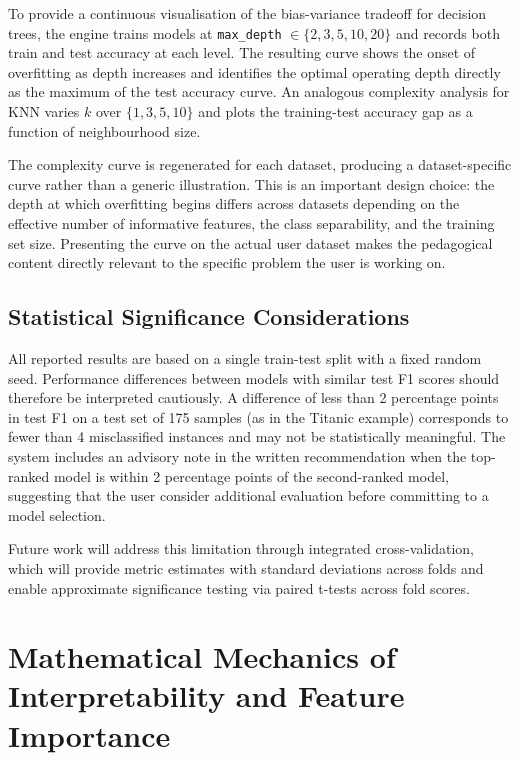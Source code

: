 \documentclass[conference]{IEEEtran}
\begin{document}
To provide a continuous visualisation of the bias-variance tradeoff for decision trees, the engine trains models at \texttt{max\_depth} $\in \{2, 3, 5, 10, 20\}$ and records both train and test accuracy at each level. The resulting curve shows the onset of overfitting as depth increases and identifies the optimal operating depth directly as the maximum of the test accuracy curve. An analogous complexity analysis for KNN varies $k$ over $\{1, 3, 5, 10\}$ and plots the training-test accuracy gap as a function of neighbourhood size.

The complexity curve is regenerated for each dataset, producing a dataset-specific curve rather than a generic illustration. This is an important design choice: the depth at which overfitting begins differs across datasets depending on the effective number of informative features, the class separability, and the training set size. Presenting the curve on the actual user dataset makes the pedagogical content directly relevant to the specific problem the user is working on.

\subsection{Statistical Significance Considerations}

All reported results are based on a single train-test split with a fixed random seed. Performance differences between models with similar test F1 scores should therefore be interpreted cautiously. A difference of less than 2 percentage points in test F1 on a test set of 175 samples (as in the Titanic example) corresponds to fewer than 4 misclassified instances and may not be statistically meaningful. The system includes an advisory note in the written recommendation when the top-ranked model is within 2 percentage points of the second-ranked model, suggesting that the user consider additional evaluation before committing to a model selection.

Future work will address this limitation through integrated cross-validation, which will provide metric estimates with standard deviations across folds and enable approximate significance testing via paired t-tests across fold scores.

\section{Mathematical Mechanics of Interpretability and Feature Importance}
\end{document}
